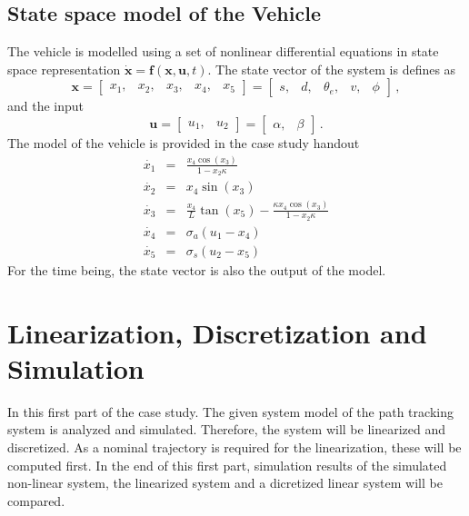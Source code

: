 \documentclass{scrartcl}
\begin{document}
\subsection*{State space model of the Vehicle}
The vehicle is modelled using a set of nonlinear differential equations in state space representation $\mathbf{\dot{x}} = \mathbf{f}(\mathbf{x}, \mathbf{u}, t)$.
The state vector of the system is defines as
\begin{equation}
	\mathbf{x} = \begin{bmatrix}
		x_1, &x_2, &x_3, &x_4, &x_5
	\end{bmatrix} = \begin{bmatrix}
		s, &d, &\theta_e, &v, &\phi
	\end{bmatrix}\, ,
\end{equation}
and the input
\begin{equation}
	\mathbf{u} = \begin{bmatrix}
		u_1, &u_2	
	\end{bmatrix} = \begin{bmatrix}
		\alpha, &\beta
	\end{bmatrix}\, .
\end{equation}
The model of the vehicle is provided in the case study handout
\begin{eqnarray}
	\dot{x_1} &=& \frac{x_4 \cos(x_3)}{1 - x_2\kappa}\label{eq:ss1}\\
	\dot{x_2} &=& x_4 \sin(x_3)\label{eq:ss2}\\
	\dot{x_3} &=& \frac{x_4}{L}\tan(x_5) - \frac{\kappa x_4 \cos(x_3)}{1 - x_2 \kappa}\label{eq:ss3}\\
	\dot{x_4} &=& \sigma_a (u_1 - x_4)\label{eq:ss4}\\
	\dot{x_5} &=& \sigma_s (u_2 - x_5)\label{eq:ss5}
\end{eqnarray}
For the time being, the state vector is also the output of the model.
\section{Linearization, Discretization and Simulation}
In this first part of the case study. The given system model of the path tracking system is analyzed and simulated.
Therefore, the system will be linearized and discretized. 
As a nominal trajectory is required for the linearization, these will be computed first.
In the end of this first part, simulation results of the simulated non-linear system, the linearized system and a dicretized linear system will be compared.
\end{document}
